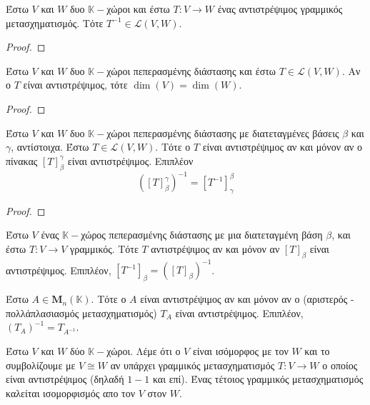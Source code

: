 \begin{thm}
  Έστω $V$ και $W$ δυο $ \mathbb{K}- $χώροι και έστω $ T \colon V \to W $ ένας 
  αντιστρέψιμος γραμμικός μετασχηματισμός. Τότε $ T^{-1} \in \mathcal{L}(V,W) $.
\end{thm}

\begin{proof}

\end{proof}

\begin{thm}
  Έστω $V$ και $W$ δυο $ \mathbb{K}- $χώροι πεπερασμένης διάστασης και έστω 
  $ T \in \mathcal{L}(V,W) $. Αν ο $T$ είναι αντιστρέψιμος, τότε 
  $ \dim(V) = \dim(W) $.
\end{thm}

\begin{proof}

\end{proof}

\begin{thm}
  Έστω $V$ και $W$ δυο $ \mathbb{K}- $χώροι πεπερασμένης διάστασης με διατεταγμένες 
  βάσεις $\beta$ και $\gamma$, αντίστοιχα. Έστω $ T \in \mathcal{L}(V,W) $. Τότε 
  ο $T$ είναι αντιστρέψιμος αν και μόνον αν ο πίνακας $ [T]_{\beta}^{\gamma } $ 
  είναι αντιστρέψιμος. Επιπλέον
  \[
    \left([T]_{\beta }^{\gamma }\right)^{-1} = [T^{-1}]_{\gamma }^{\beta} 
  \]
\end{thm}

\begin{proof}

\end{proof}


\begin{cor}
  Έστω $V$ ένας $ \mathbb{K}- $χώρος πεπερασμένης διάστασης με μια διατεταγμένη 
  βάση $ \beta $, και έστω $ T \colon V \to V $ γραμμικός. Τότε $T$ αντιστρέψιμος 
  αν και μόνον αν $ [T]_{\beta} $ είναι αντιστρέψιμος. Επιπλέον, $ [T^{-1}]_{\beta} = 
  ([T]_{\beta })^{-1}$.
\end{cor}

\begin{cor}
  Έστω $ A \in \textbf{M}_{n}(\mathbb{K})  $. Τότε ο $A$ είναι αντιστρέψιμος αν και 
  μόνον αν ο (αριστερός - πολλάπλασιασμός μετασχηματισμός) $ T_{A} $ είναι 
  αντιστρέψιμος. Επιπλέον, $ (T_{Α})^{-1} = T_{A^{-1}} $.
\end{cor}

\begin{dfn}
  Έστω $V$ και $W$ δύο $ \mathbb{K}- $χώροι. Λέμε ότι ο $V$ είναι ισόμορφος με τον 
  $W$ και το συμβολίζουμε με $ V \cong W $ αν υπάρχει γραμμικός μετασχηματισμός 
  $ T \colon V \to W $ ο οποίος είναι αντιστρέψιμος (δηλαδή $ 1-1 $ και επί). Ένας 
  τέτοιος γραμμικός μετασχηματισμός καλείται ισομορφισμός απο τον $V$ στον $W$.
\end{dfn}


